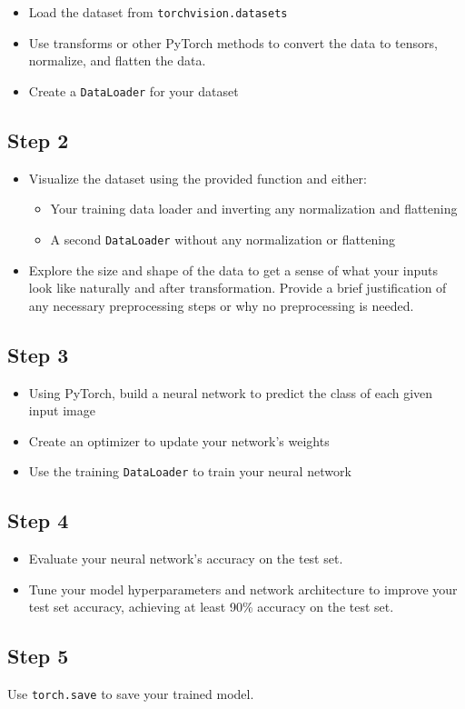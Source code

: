 \begin{itemize}
    \item Load the dataset from \verb|torchvision.datasets|
    \item Use transforms or other PyTorch methods to convert the data to tensors, normalize, and flatten the data.
    \item Create a \verb|DataLoader| for your dataset
\end{itemize}

\subsection{Step 2}

\begin{itemize}
    \item Visualize the dataset using the provided function and either:

\begin{itemize}
        \item Your training data loader and inverting any normalization and flattening
        \item A second \verb|DataLoader| without any normalization or flattening
\end{itemize}

    \item Explore the size and shape of the data to get a sense of what your inputs look like naturally and after transformation. Provide a brief justification of any necessary preprocessing steps or why no preprocessing is needed.
\end{itemize}

\subsection{Step 3}

\begin{itemize}
    \item Using PyTorch, build a neural network to predict the class of each given input image
    \item Create an optimizer to update your network’s weights
    \item Use the training \verb|DataLoader| to train your neural network
\end{itemize}

\subsection{Step 4}

\begin{itemize}
    \item Evaluate your neural network’s accuracy on the test set.
    \item Tune your model hyperparameters and network architecture to improve your test set accuracy, achieving at least 90\% accuracy on the test set.
\end{itemize}

\subsection{Step 5}

Use \verb|torch.save| to save your trained model.
